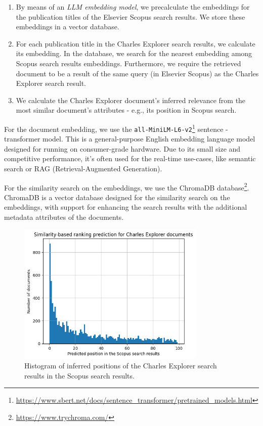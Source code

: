 \begin{enumerate}
    \item By means of an \textit{LLM embedding model}, we precalculate the embeddings for the publication titles of the Elsevier Scopus search results. 
    We store these embeddings in a vector database.
    \item For each publication title in the Charles Explorer search results, we calculate its embedding. 
    In the database, we search for the nearest embedding among Scopus search results embeddings. 
    Furthermore, we require the retrieved document to be a result of the same query (in Elsevier Scopus) as the Charles Explorer search result.
    \item We calculate the Charles Explorer document’s inferred relevance from the most similar document’s attributes - e.g., its position in Scopus search.
\end{enumerate}

For the document embedding, we use the \texttt{all-MiniLM-L6-v2}\footnote{\url{https://www.sbert.net/docs/sentence_transformer/pretrained_models.html}} sentence - transformer model. 
This is a general-purpose English embedding language model designed for running on consumer-grade hardware. 
Due to its small size and competitive performance, it’s often used for the real-time use-cases, like semantic search or RAG (Retrieval-Augmented Generation).

For the similarity search on the embeddings, we use the ChromaDB database\footnote{\url{https://www.trychroma.com/}}. 
ChromaDB is a vector database designed for the similarity search on the embeddings, with support
for enhancing the search results with the additional metadata attributes of the documents.

\begin{figure}[ht!]
    \captionsetup{width=.9\linewidth}
    \includegraphics[width=0.8\textwidth]{../img/llm-embedding-positions-hist.png}
    \centering
    \caption{Histogram of inferred positions of the Charles Explorer search results in the Scopus search results.}
\end{figure}

